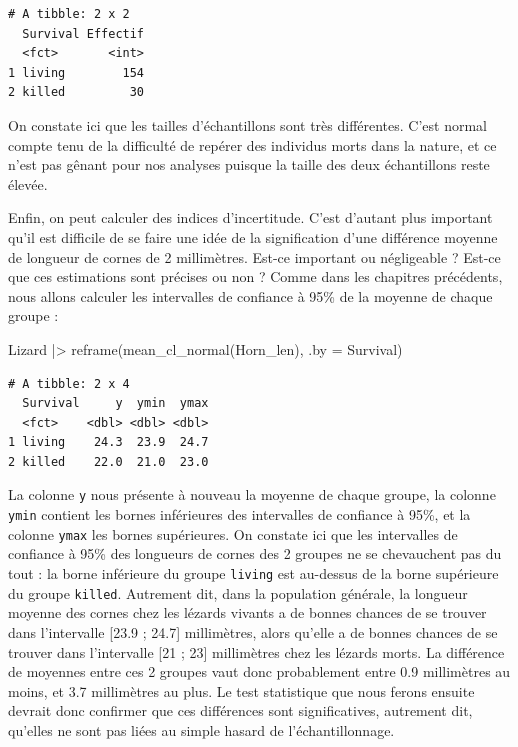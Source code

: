\documentclass[
  french,
  a4paper,
  DIV=11,
  numbers=noendperiod,
  oneside]{scrreprt}
\newenvironment{Shaded}{}{}
\newcommand{\AttributeTok}[1]{\textcolor[rgb]{0.84,0.23,0.29}{#1}}
\newcommand{\FunctionTok}[1]{\textcolor[rgb]{0.44,0.26,0.76}{#1}}
\newcommand{\NormalTok}[1]{\textcolor[rgb]{0.14,0.16,0.18}{#1}}
\newcommand{\SpecialCharTok}[1]{\textcolor[rgb]{0.00,0.36,0.77}{#1}}
\begin{document}
\begin{verbatim}
# A tibble: 2 x 2
  Survival Effectif
  <fct>       <int>
1 living        154
2 killed         30
\end{verbatim}

On constate ici que les tailles d'échantillons sont très différentes.
C'est normal compte tenu de la difficulté de repérer des individus morts
dans la nature, et ce n'est pas gênant pour nos analyses puisque la
taille des deux échantillons reste élevée.

Enfin, on peut calculer des indices d'incertitude. C'est d'autant plus
important qu'il est difficile de se faire une idée de la signification
d'une différence moyenne de longueur de cornes de 2 millimètres. Est-ce
important ou négligeable ? Est-ce que ces estimations sont précises ou
non ? Comme dans les chapitres précédents, nous allons calculer les
intervalles de confiance à 95\% de la moyenne de chaque groupe :

\begin{Shaded}
\begin{Highlighting}[]
\NormalTok{Lizard }\SpecialCharTok{|\textgreater{}} 
  \FunctionTok{reframe}\NormalTok{(}\FunctionTok{mean\_cl\_normal}\NormalTok{(Horn\_len), }\AttributeTok{.by =}\NormalTok{ Survival)}
\end{Highlighting}
\end{Shaded}

\begin{verbatim}
# A tibble: 2 x 4
  Survival     y  ymin  ymax
  <fct>    <dbl> <dbl> <dbl>
1 living    24.3  23.9  24.7
2 killed    22.0  21.0  23.0
\end{verbatim}

La colonne \texttt{y} nous présente à nouveau la moyenne de chaque
groupe, la colonne \texttt{ymin} contient les bornes inférieures des
intervalles de confiance à 95\%, et la colonne \texttt{ymax} les bornes
supérieures. On constate ici que les intervalles de confiance à 95\% des
longueurs de cornes des 2 groupes ne se chevauchent pas du tout : la
borne inférieure du groupe \texttt{living} est au-dessus de la borne
supérieure du groupe \texttt{killed}. Autrement dit, dans la population
générale, la longueur moyenne des cornes chez les lézards vivants a de
bonnes chances de se trouver dans l'intervalle {[}23.9 ; 24.7{]}
millimètres, alors qu'elle a de bonnes chances de se trouver dans
l'intervalle {[}21 ; 23{]} millimètres chez les lézards morts. La
différence de moyennes entre ces 2 groupes vaut donc probablement entre
0.9 millimètres au moins, et 3.7 millimètres au plus. Le test
statistique que nous ferons ensuite devrait donc confirmer que ces
différences sont significatives, autrement dit, qu'elles ne sont pas
liées au simple hasard de l'échantillonnage.
\end{document}

